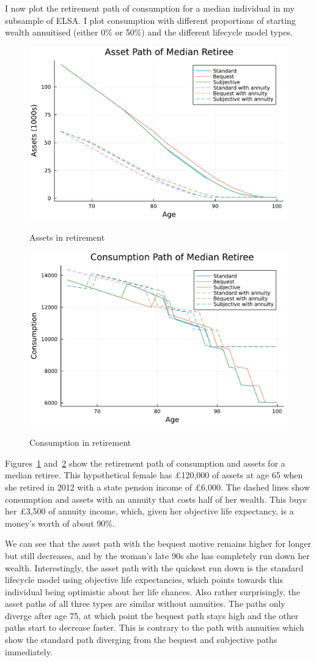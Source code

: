 \documentclass[12pt]{article}
\begin{document}
I now plot the retirement path of consumption for a median individual in my subsample of ELSA.
I plot consumption with different proportions of starting wealth
annuitised (either 0\% or 50\%) and the different lifecycle model types.

\begin{figure}[h]
  \caption{Assets in retirement}
  \centering
  \includegraphics[width=0.7\columnwidth]{figures/asset_plot_median_retiree.pdf}
  \label{fig:AssetPlot}
\end{figure}
\begin{figure}[h]
  \caption{Consumption in retirement}
  \centering
  \includegraphics[width=0.7\columnwidth]{figures/consumption_plot_median_retiree.pdf}
  \label{fig:ConsumpPlot}
\end{figure}

Figures~\ref{fig:AssetPlot} and~\ref{fig:ConsumpPlot} show the retirement path
of consumption and assets for a median retiree. This hypothetical female has
£120,000 of assets at age 65 when she retired in 2012 with a state pension
income of £6,000. The dashed lines show consumption and assets with an annuity
that costs half of her wealth. This buys her £3,500 of annuity income, which,
given her objective life expectancy, is a money's worth of about 90\%.

We can see that the asset path with the bequest motive remains higher for longer
but still decreases, and by the woman's late 90s she has completely run down her
wealth. Interestingly, the asset path with the quickest run down is the standard
lifecycle model using objective life expectancies, which points towards this
individual being optimistic about her life chances. Also rather surprisingly,
the asset paths of all three types are similar without annuities. The paths only
diverge after age 75, at which point the bequest path stays high and the other
paths start to decrease faster. This is contrary to the path with annuities
which show the standard path diverging from the bequest and subjective paths
immediately.
\end{document}
